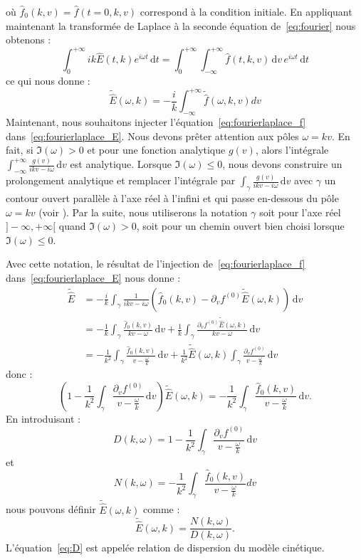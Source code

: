 où $\hat{f}_0(k,v) = \hat{f}(t=0,k,v)$ correspond à la condition initiale. En appliquant maintenant la transformée de Laplace à la seconde équation de~\eqref{eq:fourier} nous obtenons :
$$
  \int_0^{+\infty}ik\hat{E}(t,k)e^{i\omega t}\,\mathrm{d}t = \int_0^{+\infty}\int_{-\infty}^{+\infty}\hat{f}(t,k,v)\,\mathrm{d}v\,e^{i\omega t}\,\mathrm{d}t
$$
ce qui nous donne :
\begin{equation}
  \tilde{\hat{E}}(\omega,k)=-\frac{i}{k}\int_{-\infty}^{+\infty}\tilde{\hat{f}}(\omega,k,v)dv
  \label{eq:fourierlaplace_E}
\end{equation}
Maintenant, nous souhaitons injecter l'équation~\eqref{eq:fourierlaplace_f} dans~\eqref{eq:fourierlaplace_E}. Nous devons prêter attention aux pôles $\omega = kv$. En fait, si $\Im(\omega)>0$ et pour une fonction analytique $g(v)$, alors l'intégrale $\int_{-\infty}^{+\infty}\frac{g(v)}{ikv-i\omega}\,\mathrm{d}v$ est analytique. Lorsque $\Im(\omega) \leq 0$, nous devons construire un prolongement analytique et remplacer l'intégrale par $\int_\gamma \frac{g(v)}{ikv-i\omega}\,\mathrm{d}v$ avec $\gamma$ un contour ouvert parallèle à l'axe réel à l'infini et qui passe en-dessous du pôle $\omega = kv$ (voir \cite{Sonnendrucker:2015}). Par la suite, nous utiliserons la notation $\gamma$ soit pour l'axe réel $]-\infty,+\infty[$ quand $\Im(\omega)>0$, soit pour un chemin ouvert bien choisi lorsque $\Im(\omega)\leq 0$. 

Avec cette notation, le résultat de l'injection de~\eqref{eq:fourierlaplace_f} dans~\eqref{eq:fourierlaplace_E} nous donne :
$$
  \begin{aligned}
    \tilde{\hat{E}}
    & = -\frac{i}{k}\int_\gamma \frac{1}{ikv-i\omega}\left( \hat{f}_0(k,v) - \partial_vf^{(0)}\tilde{\hat{E}}(\omega,k) \right)\,\mathrm{d}v \\
    & = -\frac{1}{k}\int_\gamma \frac{\hat{f}_0(k,v)}{kv-\omega}\,\mathrm{d}v + \frac{1}{k}\int_\gamma \frac{\partial_v f^{(0)}\tilde{\hat{E}}(\omega,k)}{kv-\omega}\,\mathrm{d}v \\
    & = - \frac{1}{k^2}\int_\gamma \frac{\hat{f}_0(k,v)}{v-\frac{\omega}{k}}\,\mathrm{d}v + \frac{1}{k^2}\tilde{\hat{E}}(\omega,k)\int_\gamma \frac{\partial_v f^{(0)}}{v-\frac{\omega}{k}}\,\mathrm{d}v
  \end{aligned}
$$
donc :
$$
  \left( 1 - \frac{1}{k^2}\int_\gamma \frac{\partial_v f^{(0)}}{v-\frac{\omega}{k}}\,\mathrm{d}v \right) \tilde{\hat{E}}(\omega,k) = -\frac{1}{k^2}\int_\gamma \frac{\hat{f}_0(k,v)}{v-\frac{\omega}{k}}\,\mathrm{d}v.
$$
En introduisant :
\begin{equation}
  D(k,\omega) = 1 - \frac{1}{k^2}\int_\gamma \frac{\partial_v f^{(0)}}{v-\frac{\omega}{k}}\,\mathrm{d}v
  \label{eq:D}
\end{equation}
et
\begin{equation}
  N(k,\omega) = -\frac{1}{k^2}\int_\gamma\frac{\hat{f}_0(k,v)}{v-\frac{\omega}{k}}dv
  \label{eq:N}
\end{equation}
nous pouvons définir $\tilde{\hat{E}}(\omega,k)$ comme :
$$
  \tilde{\hat{E}}(\omega,k) = \frac{N(k,\omega)}{D(k,\omega)}.
$$
L'équation~\eqref{eq:D} est appelée relation de dispersion du modèle cinétique.

